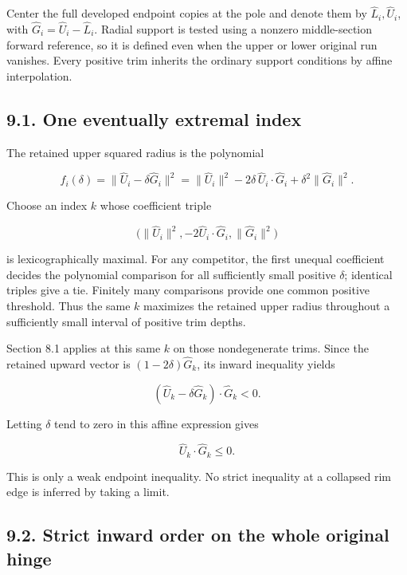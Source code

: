 \documentclass[
  11pt,
  letterpaper,
]{article}
\begin{document}
Center the full developed endpoint copies at the pole and denote them by
\(\widehat L_i,\widehat U_i\), with
\(\widehat G_i=\widehat U_i-\widehat L_i\). Radial support is tested
using a nonzero middle-section forward reference, so it is defined even
when the upper or lower original run vanishes. Every positive trim
inherits the ordinary support conditions by affine interpolation.

\subsection{9.1. One eventually extremal
index}\label{one-eventually-extremal-index}

The retained upper squared radius is the polynomial

\[
f_i(\delta)=\|\widehat U_i-\delta\widehat G_i\|^2
=\|\widehat U_i\|^2
-2\delta\,\widehat U_i\cdot\widehat G_i
+\delta^2\|\widehat G_i\|^2.
\tag{9.1}
\]

Choose an index \(k\) whose coefficient triple

\[
\bigl(\|\widehat U_i\|^2,
-2\widehat U_i\cdot\widehat G_i,
\|\widehat G_i\|^2\bigr)
\tag{9.2}
\]

is lexicographically maximal. For any competitor, the first unequal
coefficient decides the polynomial comparison for all sufficiently small
positive \(\delta\); identical triples give a tie. Finitely many
comparisons provide one common positive threshold. Thus the same \(k\)
maximizes the retained upper radius throughout a sufficiently small
interval of positive trim depths.

Section 8.1 applies at this same \(k\) on those nondegenerate trims.
Since the retained upward vector is \((1-2\delta)\widehat G_k\), its
inward inequality yields

\[
(\widehat U_k-\delta\widehat G_k)\cdot\widehat G_k<0.
\]

Letting \(\delta\) tend to zero in this affine expression gives

\[
\widehat U_k\cdot\widehat G_k\le0.
\tag{9.3}
\]

This is only a weak endpoint inequality. No strict inequality at a
collapsed rim edge is inferred by taking a limit.

\subsection{9.2. Strict inward order on the whole original
hinge}\label{strict-inward-order-on-the-whole-original-hinge}
\end{document}
